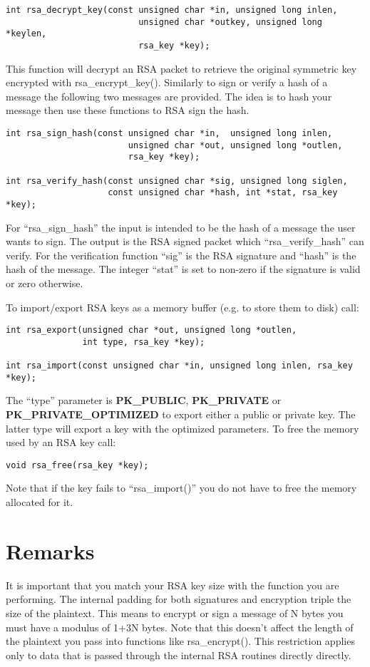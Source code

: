 \documentclass[b5paper]{book}
\begin{document}
\begin{verbatim}
int rsa_decrypt_key(const unsigned char *in, unsigned long inlen, 
                          unsigned char *outkey, unsigned long *keylen, 
                          rsa_key *key);
\end{verbatim}

This function will decrypt an RSA packet to retrieve the original symmetric key encrypted with rsa\_encrypt\_key().  
Similarly to sign or verify a hash of a message the following two messages are provided.  The idea is to hash your message 
then use these functions to RSA sign the hash.  
\begin{verbatim}
int rsa_sign_hash(const unsigned char *in,  unsigned long inlen, 
                        unsigned char *out, unsigned long *outlen, 
                        rsa_key *key);

int rsa_verify_hash(const unsigned char *sig, unsigned long siglen,
                    const unsigned char *hash, int *stat, rsa_key *key);
\end{verbatim}
For ``rsa\_sign\_hash'' the input is intended to be the hash of a message the user wants to sign.  The output is the 
RSA signed packet which ``rsa\_verify\_hash'' can verify.  For the verification function ``sig'' is the RSA signature
and ``hash'' is the hash of the message.  The integer ``stat'' is set to non-zero if the signature is valid or zero 
otherwise.

To import/export RSA keys as a memory buffer (e.g. to store them to disk) call:
\begin{verbatim}
int rsa_export(unsigned char *out, unsigned long *outlen, 
               int type, rsa_key *key);

int rsa_import(const unsigned char *in, unsigned long inlen, rsa_key *key);
\end{verbatim}

The ``type'' parameter is {\bf PK\_PUBLIC}, {\bf PK\_PRIVATE} or {\bf PK\_PRIVATE\_OPTIMIZED} to export either a public or 
private key.  The latter type will export a key with the optimized parameters.  To free the memory used by an RSA key call:
\begin{verbatim}
void rsa_free(rsa_key *key);
\end{verbatim}

Note that if the key fails to ``rsa\_import()'' you do not have to free the memory allocated for it.

\section{Remarks}
It is important that you match your RSA key size with the function you are performing.  The internal padding for both
signatures and encryption triple the size of the plaintext.  This means to encrypt or sign
a message of N bytes you must have a modulus of 1+3N bytes.  Note that this doesn't affect the length of the plaintext 
you pass into functions like rsa\_encrypt().  This restriction applies only to data that is passed through the
internal RSA routines directly directly.
\end{document}
